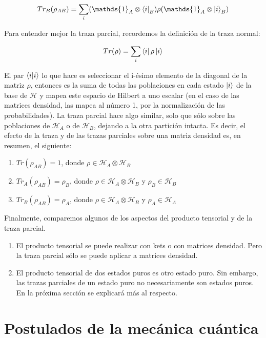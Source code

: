 \begin{equation}
    Tr_B(\rho_{A B}) = \sum\limits_i (\mathds{1}_A \otimes \bra{i}_B) \rho (\mathds{1}_A \otimes \ket{i}_B)
\end{equation}

Para entender mejor la traza parcial, recordemos la definición de la traza normal:

\begin{equation}
    Tr(\rho) = \sum\limits_i \bra{i} \rho \ket{i}
\end{equation}

El par $\bra{i} \ket{i}$ lo que hace es seleccionar el i-ésimo elemento de la diagonal de la matriz $\rho$, entonces es la suma de todas las poblaciones en cada estado $\ket{i}$ de la base de $\mathcal{H}$ y mapea este espacio de Hilbert a uno escalar (en el caso de las matrices densidad, las mapea al número 1, por la normalización de las probabilidades). La traza parcial hace algo similar, solo que sólo sobre las poblaciones de $\mathcal{H}_A$ o de $\mathcal{H}_B$, dejando a la otra partición intacta. Es decir, el efecto de la traza y de las trazas parciales sobre una matriz densidad es, en resumen, el siguiente:

\begin{enumerate}
    \item $Tr(\rho_{A B}) = 1$, donde $\rho \in \mathcal{H}_A \otimes \mathcal{H}_B$
    \item $Tr_A(\rho_{A B}) = \rho_B$, donde $\rho \in \mathcal{H}_A \otimes \mathcal{H}_B$ y $\rho_B \in \mathcal{H}_B$
    \item $Tr_B(\rho_{A B}) = \rho_A$, donde $\rho \in \mathcal{H}_A \otimes \mathcal{H}_B$ y $\rho_A \in \mathcal{H}_A$
\end{enumerate}

Finalmente, comparemos algunos de los aspectos del producto tensorial y de la traza parcial.

\begin{enumerate}
    \item El producto tensorial se puede realizar con kets o con matrices densidad. Pero la traza parcial sólo se puede aplicar a matrices densidad.
    \item El producto tensorial de dos estados puros es otro estado puro. Sin embargo, las trazas parciales de un estado puro no necesariamente son estados puros. En la próxima sección se explicará más al respecto.
\end{enumerate}

\section{Postulados de la mecánica cuántica}

